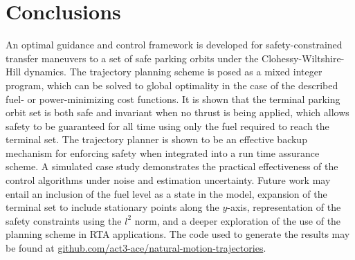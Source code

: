\documentclass[twocolumn,letterpaper]{IEEEAerospaceCLS}  %
\theoremstyle{definition}
\begin{document}










\section{Conclusions}
An optimal guidance and control framework is developed for safety-constrained transfer maneuvers to a set of safe parking orbits under the Clohessy-Wiltshire-Hill dynamics. 
The trajectory planning scheme is posed as a mixed integer program, which can be solved to global optimality in the case of the described fuel- or power-minimizing cost functions.
It is shown that the terminal parking orbit set is both safe and invariant when no thrust is being applied, which allows safety to be guaranteed for all time using only the fuel required to reach the terminal set. 
The trajectory planner is shown to be an effective backup mechanism for enforcing safety when integrated into a run time assurance scheme. 
A simulated case study demonstrates the practical effectiveness of the control algorithms under noise and estimation uncertainty. 
Future work may entail an inclusion of the fuel level as a state in the model, expansion of the terminal set to include stationary points along the $y$-axis, representation of the safety constraints using the $l^2$ norm, and a deeper exploration of the use of the planning scheme in RTA applications. The code used to generate the results may be found at \url{github.com/act3-ace/natural-motion-trajectories}.
\end{document}
